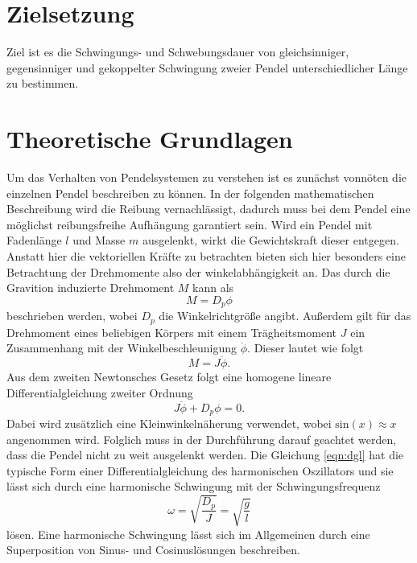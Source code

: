 \section{Zielsetzung}

Ziel ist es die Schwingungs- und Schwebungsdauer von gleichsinniger, gegensinniger und gekoppelter Schwingung zweier Pendel unterschiedlicher Länge zu bestimmen. 

\section{Theoretische Grundlagen}
Um das Verhalten von Pendelsystemen zu verstehen ist es zunächst vonnöten die einzelnen Pendel beschreiben zu können. In der folgenden mathematischen Beschreibung wird die Reibung vernachlässigt, dadurch muss 
bei dem Pendel eine möglichst reibungsfreihe Aufhängung garantiert sein. Wird ein Pendel mit Fadenlänge $l$ und Masse $m$ ausgelenkt, wirkt die Gewichtskraft dieser entgegen. Anstatt hier die vektoriellen Kräfte zu betrachten bieten 
sich hier besonders eine Betrachtung der Drehmomente also der winkelabhängigkeit an. Das durch die Gravition induzierte Drehmoment $M$ kann als 
\begin{equation}
M = D_{p} \phi
\end{equation}
beschrieben werden, wobei $D_{p}$ die Winkelrichtgröße angibt.
Außerdem gilt für das Drehmoment eines beliebigen Körpers mit einem Trägheitsmoment $J$ ein Zusammenhang mit der Winkelbeschleunigung $\ddot{\phi}$. Dieser lautet wie folgt
\begin{equation}
M = J \ddot{\phi}.
\end{equation}
Aus dem zweiten Newtonsches Gesetz folgt eine homogene lineare Differentialgleichung zweiter Ordnung
\begin{equation}
    \label{eqn:dgl}
J \ddot{\phi} + D_{p} \phi = 0.
\end{equation}
Dabei wird zusätzlich eine Kleinwinkelnäherung verwendet, wobei $\text{sin}(x) \approx x$ angenommen wird. Folglich muss in der Durchführung darauf geachtet werden, dass die Pendel nicht zu 
weit ausgelenkt werden.
Die Gleichung \eqref{eqn:dgl} hat die typische Form einer Differentialgleichung des harmonischen Oszillators und sie lässt sich durch eine harmonische Schwingung mit der Schwingungsfrequenz
\begin{equation}
\omega = \sqrt{\frac{D_{p}}{J}} = \sqrt{\frac{g}{l}}
\end{equation}
lösen. Eine harmonische Schwingung lässt sich im Allgemeinen durch eine Superposition von Sinus- und Cosinuslösungen beschreiben.

